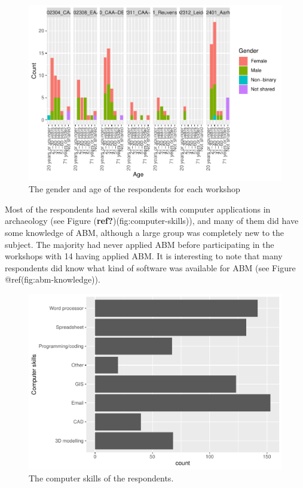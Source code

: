 \documentclass[
]{article}
\begin{document}
\begin{figure}
\centering
\includegraphics{paper_files/figure-latex/gender-age-1.pdf}
\caption{The gender and age of the respondents for each workshop}
\end{figure}

Most of the respondents had several skills with computer applications in
archaeology (see Figure (\textbf{ref?})(fig:computer-skills)), and many
of them did have some knowledge of ABM, although a large group was
completely new to the subject. The majority had never applied ABM before
participating in the workshops with 14 having applied ABM. It is
interesting to note that many respondents did know what kind of software
was available for ABM (see Figure @ref(fig:abm-knowledge)).

\begin{figure}
\centering
\includegraphics{paper_files/figure-latex/computer-skills-1.pdf}
\caption{The computer skills of the respondents.}
\end{figure}
\end{document}
